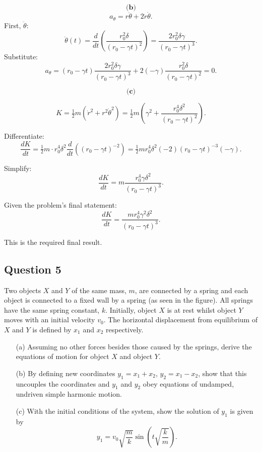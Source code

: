 \documentclass{article}
\begin{document}
\[
\textbf{(b)}
\]
\[
a_\theta = r \ddot{\theta} + 2\dot{r}\dot{\theta}.
\]
First, \(\ddot{\theta}\):
\[
\ddot{\theta}(t) = \frac{d}{dt}\left(\frac{r_0^2 \delta}{(r_0 - \gamma t)^2}\right) = \frac{2 r_0^2 \delta \gamma}{(r_0 - \gamma t)^3}.
\]
Substitute:
\[
a_\theta = (r_0 - \gamma t)\frac{2r_0^2 \delta \gamma}{(r_0 - \gamma t)^3} + 2(-\gamma)\frac{r_0^2 \delta}{(r_0-\gamma t)^2} = 0.
\]

\[
\textbf{(c)}
\]

\[
K = \tfrac{1}{2}m(\dot{r}^2 + r^2 \dot{\theta}^2) = \tfrac{1}{2}m\left(\gamma^2 + \frac{r_0^4 \delta^2}{(r_0-\gamma t)^2}\right).
\]

Differentiate:
\[
\frac{dK}{dt} = \tfrac{1}{2}m \cdot r_0^4 \delta^2 \frac{d}{dt}((r_0-\gamma t)^{-2})
= \tfrac{1}{2}m r_0^4 \delta^2( -2 )(r_0-\gamma t)^{-3}(-\gamma).
\]

Simplify:
\[
\frac{dK}{dt} = m \frac{r_0^4 \gamma \delta^2}{(r_0-\gamma t)^3}.
\]

Given the problem's final statement:
\[
\boxed{\frac{dK}{dt} = \frac{m r_0^4 \gamma^2 \delta^2}{(r_0-\gamma t)^3}.}
\]

This is the required final result.

\subsection{Question 5}

Two objects $X$ and $Y$ of the same mass, $m$, are connected by a spring and each object is connected to a fixed wall by a spring (as seen in the figure). All springs have the same spring constant, $k$. Initially, object $X$ is at rest whilst object $Y$ moves with an initial velocity $v_0$. The horizontal displacement from equilibrium of $X$ and $Y$ is defined by $x_1$ and $x_2$ respectively.

\begin{enumerate}
    \item[(a)] Assuming no other forces besides those caused by the springs, derive the equations of motion for object $X$ and object $Y$.
    \item[(b)] By defining new coordinates $y_1 = x_1 + x_2$, $y_2 = x_1 - x_2$, show that this uncouples the coordinates and $y_1$ and $y_2$ obey equations of undamped, undriven simple harmonic motion.
    \item[(c)] With the initial conditions of the system, show the solution of $y_1$ is given by
    \[
    y_1 = v_0 \sqrt{\frac{m}{k}} \sin\left(t \sqrt{\frac{k}{m}}\right).
    \]
\end{enumerate}
\end{document}
